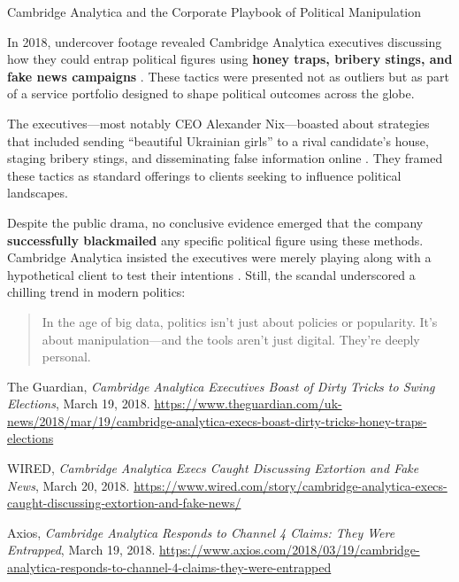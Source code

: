 \begin{HistoricalSidebar}{Cambridge Analytica and the Corporate Playbook of Political Manipulation}

    In 2018, undercover footage revealed Cambridge Analytica executives discussing how 
    they could entrap political figures using \textbf{honey traps, bribery stings, and 
    fake news campaigns} \cite{guardian2018}. These tactics were presented not as outliers 
    but as part of a service portfolio designed to shape political outcomes across the globe.
    
    \medskip
    
    The executives—most notably CEO Alexander Nix—boasted about strategies that included sending 
    ``beautiful Ukrainian girls'' to a rival candidate’s house, staging bribery stings, and 
    disseminating false information online \cite{wired2018}. They framed these tactics as 
    standard offerings to clients seeking to influence political landscapes.
    
    \medskip
    
    Despite the public drama, no conclusive evidence emerged that the company \textbf{successfully 
    blackmailed} any specific political figure using these methods. Cambridge Analytica insisted 
    the executives were merely playing along with a hypothetical client to test their 
    intentions \cite{axios2018}. Still, the scandal underscored a chilling trend in modern politics:
    
    \begin{quote}
    In the age of big data, politics isn't just about policies or popularity.  
    It's about manipulation—and the tools aren't just digital. They're deeply personal.
    \end{quote}
    
    \begin{thebibliography}{9}
    The Guardian, \textit{Cambridge Analytica Executives Boast of Dirty Tricks to Swing Elections}, 
    March 19, 2018. 
    \url{https://www.theguardian.com/uk-news/2018/mar/19/cambridge-analytica-execs-boast-dirty-tricks-honey-traps-elections}
    
    WIRED, \textit{Cambridge Analytica Execs Caught Discussing Extortion and Fake News}, March 20, 2018. 
    \url{https://www.wired.com/story/cambridge-analytica-execs-caught-discussing-extortion-and-fake-news/}
    
    Axios, \textit{Cambridge Analytica Responds to Channel 4 Claims: They Were Entrapped}, March 19, 2018. 
    \url{https://www.axios.com/2018/03/19/cambridge-analytica-responds-to-channel-4-claims-they-were-entrapped}
    \end{thebibliography}
    
\end{HistoricalSidebar}

